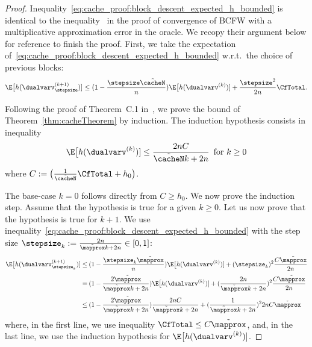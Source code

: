 \documentclass{article}
\begin{document}
\begin{proof}
Inequality~\eqref{eq:cache_proof:block_descent_expected_h_bounded} is identical to the inequality~\citep[Eq.~(20)]{lacosteJulien13bcfw} in the proof of convergence of BCFW with a multiplicative approximation error in the oracle.
We recopy their argument below for reference to finish the proof.
First, we take the expectation of~\eqref{eq:cache_proof:block_descent_expected_h_bounded} w.r.t.\ the choice of previous blocks:
\begin{equation}
\label{eq:cache_proof:block_descent_expected_h_bounded2}
    \E\big[ h(\dualvarv^{(k+1)}_\stepsize)] \leq (1-\frac{\stepsize\tilde{\cacheN}}{n})\E\big[h(\dualvarv^{(k)})]+ \frac{\stepsize^2}{2n}\CfTotal.
\end{equation}

Following the proof of Theorem~C.1 in~\citet{lacosteJulien13bcfw}, we prove the bound of Theorem~\ref{thm:cacheTheorem} by induction. The induction hypothesis consists in inequality
\begin{equation*}
\E\big[h(\dualvarv^{(k)})] \le \frac{2nC}{\tilde{\cacheN}k+2n} \, \text{ for } k\geq 0
\end{equation*}
where $C:=\big(\frac{1}{\tilde{\cacheN}}\CfTotal+ h_0\big)$. 

The base-case $k=0$ follows directly from $C\geq h_0$.
We now prove the induction step. Assume that the hypothesis is true for a given $k\geq 0$. 
Let us now prove that the hypothesis is true for $k+1$.
We use inequality~\eqref{eq:cache_proof:block_descent_expected_h_bounded} with the step size $\stepsize_k:=\frac{2n}{\tilde{\mapprox} k+2n} \in[0,1]$:
\begin{align*}
\E\big[ h(\dualvarv^{(k+1)}_{\stepsize_k})] \le&\: (1- \frac{\stepsize_k\tilde{\mapprox}}{n}) \E\big[h(\dualvarv^{(k)})] + (\stepsize_k)^2 \frac{C\tilde{\mapprox}}{2n} \\[3pt]
=& \: (1-\frac{2\tilde{\mapprox}}{\tilde{\mapprox} k+2n}) \E\big[h(\dualvarv^{(k)})] + (\frac{2n}{\tilde{\mapprox} k+2n})^2 \frac{C\tilde{\mapprox}}{2n}  \\[3pt]
\le& \: (1-\frac{2\tilde{\mapprox}}{\tilde{\mapprox} k+2n}) \frac{2n C}{\tilde{\mapprox} k+2n} + (\frac{1}{\tilde{\mapprox} k+2n})^2 2nC\tilde{\mapprox}
\end{align*}
where, in the first line, we use inequality $\CfTotal \le C \tilde{\mapprox}$, and, in the last line, we use the induction hypothesis for $\E\big[h(\dualvarv^{(k)})]$.


\end{proof}
\end{document}
